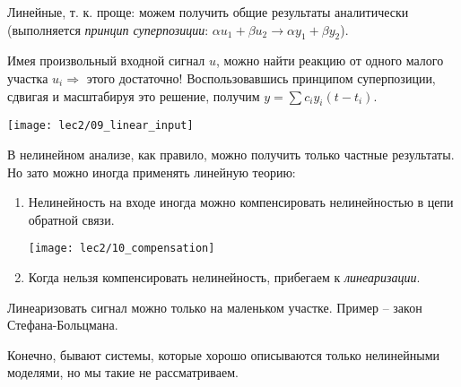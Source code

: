 \documentclass[main.tex]{subfiles}
\begin{document}
Линейные, т. к. проще: можем получить общие результаты аналитически (выполняется \emph{принцип суперпозиции}: $ \alpha u_1 + \beta u_2 \to \alpha y_1 + \beta y_2 $).

Имея произвольный входной сигнал $ u $, можно найти реакцию от одного малого участка $ u_i \Rightarrow $ этого достаточно!
Воспользовавшись принципом суперпозиции, сдвигая и масштабируя это решение, получим $ y = \sum c_i y_i (t - t_i) $.

\texttt{[image: lec2/09\_linear\_input]}

В нелинейном анализе, как правило, можно получить только частные результаты.
Но зато можно иногда применять линейную теорию:

\begin{enumerate}[noitemsep]
    \item Нелинейность на входе иногда можно компенсировать нелинейностью в цепи обратной связи.

    \texttt{[image: lec2/10\_compensation]}

    \item Когда нельзя компенсировать нелинейность, прибегаем к \emph{линеаризации}.
\end{enumerate}

Линеаризовать сигнал можно только на маленьком участке.
Пример -- закон Стефана-Больцмана.

Конечно, бывают системы, которые хорошо описываются только нелинейными моделями, но мы такие не рассматриваем.
\end{document}
